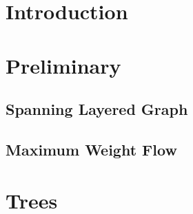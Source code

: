 \begin{abstract}

\end{abstract}

\section{Introduction}


\section{Preliminary}


	\subsection{Spanning Layered Graph}
	
	
	\subsection{Maximum Weight Flow}
	

\section{Trees}


\section{\FIXEDCARPOOL{}}


\section{\UCCARPOOL{}}


\section{\UWCARPOOL{}}


\section{\CARPOOL{}}

